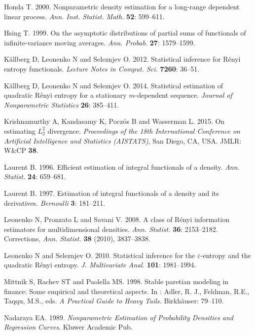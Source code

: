 \documentclass[11pt]{article}
\begin{document}
\begin{thebibliography}{99}
Honda T. 2000. Nonparametric density estimation for a long-range dependent linear process. {\it Ann. Inst. Statist. Math.} \textbf{52}:  599--611. 

Hsing T. 1999. On the asymptotic distributions of partial sums of functionals of infinite-variance moving averages. {\it Ann. Probab.} \textbf{27}: 1579--1599.
 
 
K\"{a}llberg D,  Leonenko N and Seleznjev O.  2012. Statistical inference for R\'{e}nyi entropy functionals. {\it Lecture Notes in Comput. Sci.} \textbf{7260}: 36--51.

K\"{a}llberg D,  Leonenko N and Seleznjev O.  2014.  Statistical estimation of quadratic R\'{e}nyi entropy for a stationary $m$-dependent sequence. {\it Journal of Nonparametric Statistics} \textbf{26}: 385--411.


Krishnamurthy A,  Kandasamy K,  Pocz\'{o}s B and Wasserman L.  2015. On estimating $L_2^2$ divergence.  {\it Proceedings of the 18th International Conference on Artificial Intelligence and Statistics (AISTATS)}, San Diego, CA, USA. JMLR: W\&CP  {\bf 38}.

Laurent B. 1996. Efficient estimation of integral functionals of a density. {\it Ann. Statist.} \textbf{24}:  659--681.

Laurent B. 1997. Estimation of integral functionals of a density and its derivatives. {\it Bernoulli}  \textbf{3}: 181--211.

Leonenko N, Pronzato L and Savani V. 2008.   A class of R\'{e}nyi information estimators for multidimensional densities. {\it Ann. Statist.} \textbf{36}: 2153--2182. Corrections, {\it Ann. Statist.} \textbf{38}  (2010), 3837--3838.

Leonenko N and Seleznjev O. 2010.  Statistical inference for the $\varepsilon$-entropy and the quadratic R\'{e}nyi entropy.
{\it J. Multivariate Anal.} \textbf{101}: 1981--1994.

Mittnik S,  Rachev ST and Paolella MS. 1998.  Stable paretian modeling in finance: Some empirical and theoretical aspects. In : Adler, R. J., Feldman, R.E., Taqqu, M.S., eds.  {\em A Practical Guide to Heavy Tails.}  Birkh\"{a}user: 79--110.

Nadaraya EA. 1989.  {\it Nonparametric Estimation of Probability Densities and Regression Curves}. Kluwer Academic Pub.


\end{thebibliography}
\end{document}
